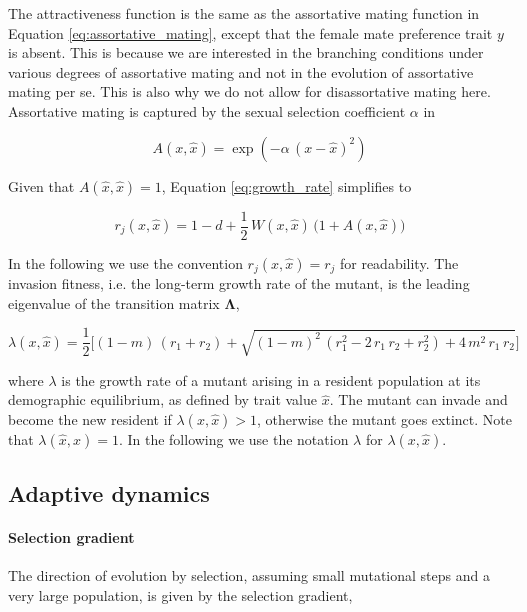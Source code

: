 The attractiveness function is the same as the assortative mating function in Equation \ref{eq:assortative_mating}, except that the female mate preference trait $y$ is absent. This is because we are interested in the branching conditions under various degrees of assortative mating and not in the evolution of assortative mating per se. This is also why we do not allow for disassortative mating here. Assortative mating is captured by the sexual selection coefficient $\alpha$ in

\begin{equation}
    A(x, \hat{x}) = \exp{(-\alpha \, (x - \hat{x})^2)}
\end{equation}

Given that $A(\hat{x}, \hat{x}) = 1$, Equation \ref{eq:growth_rate} simplifies to

\begin{equation}
    r_j(x, \hat{x}) = 1 - d + \frac{1}{2} \, W(x, \hat{x}) \, \big(1 + A(x, \hat{x})\big)
\end{equation}

In the following we use the convention $r_j(x, \hat{x}) = r_j$ for readability. The invasion fitness, i.e. the long-term growth rate of the mutant, is the leading eigenvalue of the transition matrix $\pmb{\Lambda}$,

\begin{equation}
    \lambda(x, \hat{x}) = \frac{1}{2} \bigg[(1-m) \, (r_1 + r_2) + \sqrt{(1-m)^2 \, (r_1^2 - 2 \, r_1 \, r_2 + r_2^2) + 4 \, m^2 \, r_1 \, r_2} \bigg]
    \label{eq:invasion_fitness}
\end{equation}

where $\lambda$ is the growth rate of a mutant arising in a resident population at its demographic equilibrium, as defined by trait value $\hat{x}$. The mutant can invade and become the new resident if $\lambda(x, \hat{x}) > 1$, otherwise the mutant goes extinct. Note that $\lambda(\hat{x}, \hat{x}) = 1$. In the following we use the notation $\lambda$ for $\lambda(x, \hat{x})$.

\subsection*{Adaptive dynamics}

\paragraph{Selection gradient} The direction of evolution by selection, assuming small mutational steps and a very large population, is given by the selection gradient,

